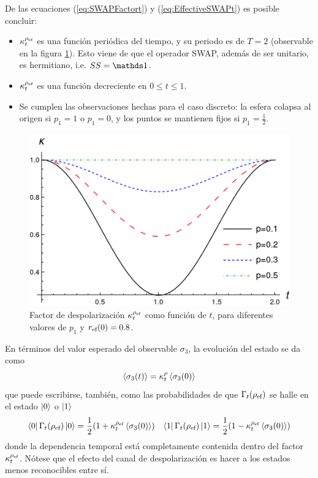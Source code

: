 De las ecuaciones (\ref{eq:SWAPFactort}) y (\ref{eq:EffectiveSWAPt}) es posible concluir:
\begin{itemize}
  \item $\kappa_{t}^{\rho_{\text{ef}}}$ es una función periódica del tiempo, y su periodo es de $T=2$ (observable en la figura \ref{fig:SWAPFactor2Dt}). Esto viene de que el operador SWAP, además de ser unitario, es hermitiano, i.e. $SS=\Id$.
  \item $\kappa_{t}^{\rho_{\text{ef}}}$ es una función decreciente en $0\leq t\leq 1$.
  \item Se cumplen las observaciones hechas para el caso discreto: la esfera colapsa al origen si $p_{1}=1$ o $p_{1}=0$, y los puntos se mantienen fijos si $p_{1}=\frac{1}{2}$.
\end{itemize}

\begin{figure}[ht!]
  \centering
  \includegraphics[width=0.6\linewidth]{chapter3/figures_toy/ContractionFactorSWAP_z=0.8_t=0_to_t=2.png}
  \caption{Factor de despolarización $\kappa_{t}^{\rho_{\text{ef}}}$ como función de $t$, para diferentes valores de $p_{1}$ y $r_{\text{ef}}(0)=0.8$.}
  \label{fig:SWAPFactor2Dt}
\end{figure}

En términos del valor esperado del observable $\sigma_{3}$, la evolución del estado se da como
\begin{equation}
  \expval{\sigma_{3}(t)}=\kappa_{t}^{\rho}\expval{\sigma_{3}(0)}
\end{equation}
que puede escribirse, también, como las probabilidades de que $\Gamma_{t}(\rho_{\text{ef}})$ se halle en el estado $\ket{0}$ o $\ket{1}$
 \begin{align}
  \bra{0}\Gamma_{t}(\rho_{\text{ef}})\ket{0}=\frac{1}{2}(1+\kappa_{t}^{\rho_{\text{ef}}}\expval{\sigma_{3}(0)}) && \bra{1}\Gamma_{t}(\rho_{\text{ef}})\ket{1}=\frac{1}{2}(1-\kappa_{t}^{\rho_{\text{ef}}}\expval{\sigma_{3}(0)})
 \end{align}
 donde la dependencia temporal está completamente contenida dentro del factor $\kappa_{t}^{\rho_{\text{ef}}}$. Nótese que el efecto del canal de despolarización es hacer a los estados menos reconocibles entre sí.


